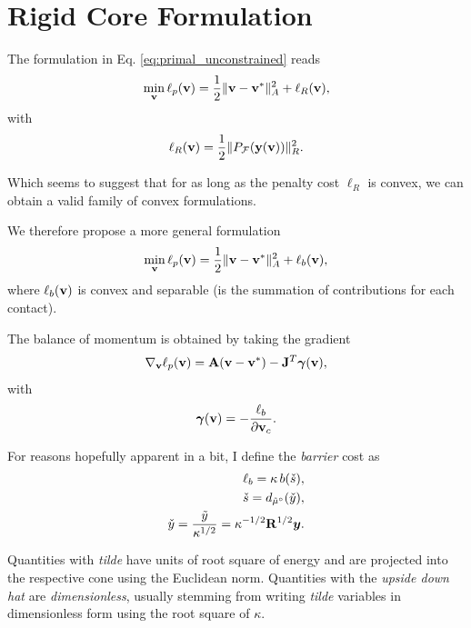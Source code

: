 \section{Rigid Core Formulation}
\label{sec:rigid_core_formulation}


The formulation in Eq. \eqref{eq:primal_unconstrained} reads
\begin{eqnarray}
	\min_{{\mathbf{v}}} \ell_p({\mathbf{v}}) = \frac{1}{2}\Vert{\mathbf{v}}-{\mathbf{v}}^*\Vert_{A}^2 +
	\ell_R({\mathbf{v}}),
\end{eqnarray}
with 
\begin{eqnarray}
    \ell_R({\mathbf{v}})= \frac{1}{2}\Vert P_\mathcal{F}({\mathbf{y}}({\mathbf{v}}))\Vert_R^2.
\end{eqnarray}

Which seems to suggest that for as long as the penalty cost $\ell_R$ is convex,
we can obtain a valid family of convex formulations.

We therefore propose a more general formulation
\begin{eqnarray}
	\min_{{\mathbf{v}}} \ell_p({\mathbf{v}}) = \frac{1}{2}\Vert{\mathbf{v}}-{\mathbf{v}}^*\Vert_{A}^2 +
	\ell_b({\mathbf{v}}),
\end{eqnarray}
where $\ell_b({\mathbf{v}})$ is convex and separable (is the summation of
contributions for each contact).

The balance of momentum is obtained by taking the gradient
\begin{equation*}
	\nabla_{\mathbf{v}}\ell_p({\mathbf{v}}) = {\mathbf{A}}({\mathbf{v}}-{\mathbf{v}}^*) - {\mathbf{J}}^T{\bm\gamma}({\mathbf{v}}),
\end{equation*}
with
\begin{equation*}
    {\bm\gamma}({\mathbf{v}}) = -\frac{\ell_b}{\partial{\mathbf{v}}_c}.
\end{equation*}    

For reasons hopefully apparent in a bit, I define the \textit{barrier} cost as
\begin{eqnarray}
    \ell_b = \kappa\,b(\check{s}),
    \label{eq:barrier_cost}\\
    \check{s} = d_{\tilde{\mu}^\circ}(\check{y}),\\
    \check{y} = \frac{\tilde{y}}{\kappa^{1/2}} = \kappa^{-1/2}\mf{R}^{1/2}\vf{y}.
\end{eqnarray}

Quantities with \textit{tilde} have units of root square of energy and are
projected into the respective cone using the Euclidean norm. Quantities with the
\textit{upside down hat} are \textit{dimensionless}, usually stemming from
writing \textit{tilde} variables in dimensionless form using the root square of
$\kappa$.

